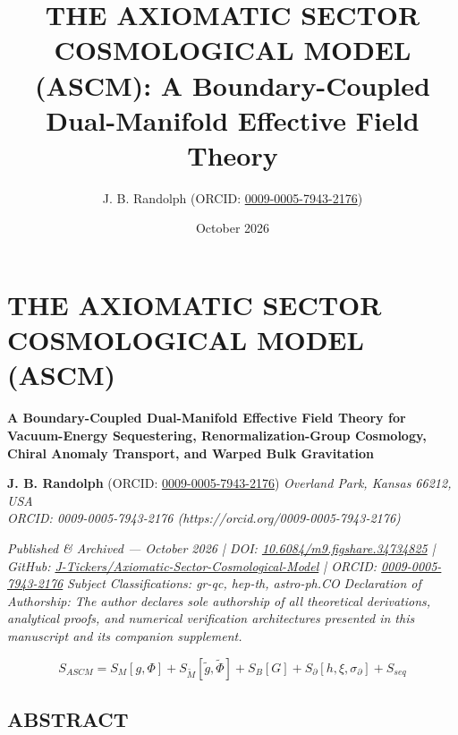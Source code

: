 \documentclass[aps,prd,onecolumn,superscriptaddress,nofootinbib,longbibliography,10pt]{revtex4-2}
\begin{document}
\title{THE AXIOMATIC SECTOR COSMOLOGICAL MODEL (ASCM): A Boundary-Coupled Dual-Manifold Effective Field Theory}
\author{J. B. Randolph (ORCID: \href{https://orcid.org/0009-0005-7943-2176}{0009-0005-7943-2176})}
\date{October 2026}
\maketitle


 

  
\section*{THE AXIOMATIC SECTOR COSMOLOGICAL MODEL (ASCM)}

  \textbf{A Boundary-Coupled Dual-Manifold Effective Field Theory for Vacuum-Energy Sequestering, Renormalization-Group Cosmology, Chiral Anomaly Transport, and Warped Bulk Gravitation}


  \textbf{J. B. Randolph} (ORCID: \href{https://orcid.org/0009-0005-7943-2176}{0009-0005-7943-2176})
  \textit{Overland Park, Kansas 66212, USA \\
\textit{ORCID: 0009-0005-7943-2176 (https://orcid.org/0009-0005-7943-2176)}}


  \textit{Published \& Archived — October 2026 | DOI: \href{https://doi.org/10.6084/m9.figshare.34734825}{10.6084/m9.figshare.34734825} | GitHub: \href{https://github.com/J-Tickers/Axiomatic-Sector-Cosmological-Model}{J-Tickers/Axiomatic-Sector-Cosmological-Model} | ORCID: \href{https://orcid.org/0009-0005-7943-2176}{0009-0005-7943-2176}}
  \textit{Subject Classifications: gr-qc, hep-th, astro-ph.CO}
  \textit{Declaration of Authorship: The author declares sole authorship of all theoretical derivations, analytical proofs, and numerical verification architectures presented in this manuscript and its companion supplement.}


  \[ S_{ASCM} = S_M[g,\Phi] + S_{\tilde{M}}[\tilde{g},\tilde{\Phi}] + S_B[G] + S_\partial[h,\xi,\sigma_\partial] + S_{seq} \]


 

  
\subsection*{ABSTRACT}
\end{document}
